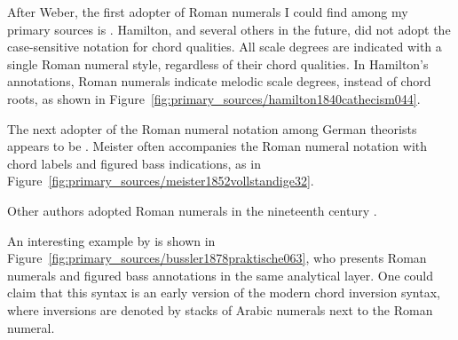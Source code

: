 After Weber, the first adopter of Roman numerals I could find among my primary sources is \textcite{hamilton1840catechism}.
Hamilton, and several others in the future, did not adopt the case-sensitive notation for chord qualities.
All scale degrees are indicated with a single Roman numeral style, regardless of their chord qualities.
In Hamilton's annotations, Roman numerals indicate melodic scale degrees, instead of chord roots, as shown in Figure~\ref{fig:primary_sources/hamilton1840cathecism044}.


The next adopter of the Roman numeral notation among German theorists appears to be \textcite{meister1852vollstandige}.
Meister often accompanies the Roman numeral notation with chord labels and figured bass indications, as in Figure~\ref{fig:primary_sources/meister1852vollstandige32}.


Other authors adopted Roman numerals in the nineteenth century \parencite{sechter1853grundsatze, richter1860lehrbuch, tiersch1874elementarbuch, tracy1878theory}.

An interesting example by \textcite{bussler1878praktische} is shown in Figure~\ref{fig:primary_sources/bussler1878praktische063}, who presents Roman numerals and figured bass annotations in the same analytical layer.
One could claim that this syntax is an early version of the modern chord inversion syntax, where inversions are denoted by stacks of Arabic numerals next to the Roman numeral.


